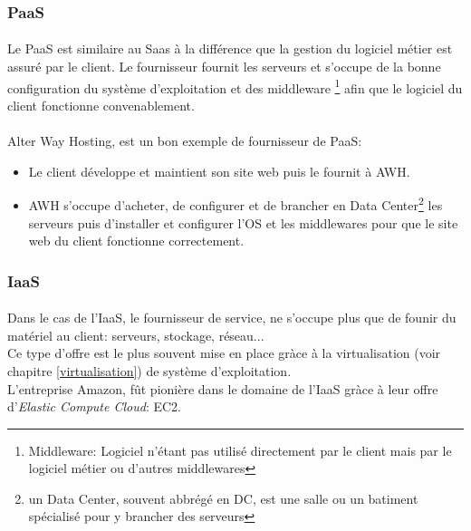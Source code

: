 \subsubsection{PaaS}
\paragraph*{}
Le PaaS est similaire au Saas à la différence que la gestion du logiciel métier est assuré par le client.
Le fournisseur fournit les serveurs et s'occupe de la bonne configuration du système d'exploitation et des middleware
\footnote{Middleware: Logiciel n'étant pas utilisé directement par le client mais par le logiciel métier ou d'autres middlewares} afin
que le logiciel du client fonctionne convenablement.

\paragraph*{}
Alter Way Hosting, est un bon exemple de fournisseur de PaaS: \\
\begin{itemize}
\item 	Le client développe et maintient son site web puis le fournit à AWH.\\
\item 	AWH s'occupe d'acheter, de configurer et de brancher en Data Center\footnote{un Data Center, souvent abbrégé en DC, est une salle
		ou un batiment spécialisé pour y brancher des serveurs} les serveurs puis d'installer et configurer l'OS et les middlewares pour que
		le site web du client fonctionne correctement.
\end{itemize}

\subsubsection{IaaS}
\paragraph*{}
Dans le cas de l'IaaS, le fournisseur de service, ne s'occupe plus que de founir du matériel au client: serveurs, stockage, réseau...
\\
Ce type d'offre est le plus souvent mise en place gràce à la virtualisation (voir chapitre \ref{virtualisation}) de système d'exploitation.
\\
L'entreprise Amazon, fût pionière dans le domaine de l'IaaS gràce à leur offre d'\textsl{Elastic Compute Cloud}: EC2.

